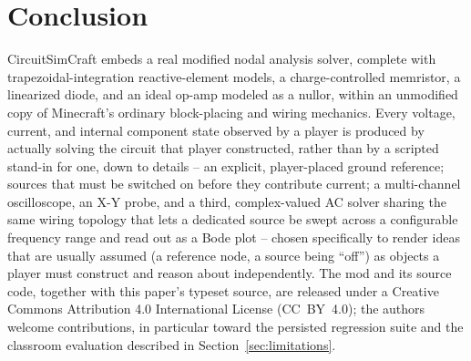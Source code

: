 \section{Conclusion}
\label{sec:conclusion}

CircuitSimCraft embeds a real modified nodal analysis solver, complete with
trapezoidal-integration reactive-element models, a charge-controlled memristor, a linearized
diode, and an ideal op-amp modeled as a nullor, within an unmodified copy of Minecraft's
ordinary block-placing and wiring mechanics. Every voltage, current, and internal component
state observed by a player is produced by actually solving the circuit that player
constructed, rather than by a scripted stand-in for one, down to details -- an explicit,
player-placed ground reference; sources that must be switched on before they contribute
current; a multi-channel oscilloscope, an X-Y probe, and a third, complex-valued AC solver
sharing the same wiring topology that lets a dedicated source be swept across a configurable
frequency range and read out as a Bode plot -- chosen specifically to render ideas that are
usually assumed (a reference node, a source being ``off'') as objects a player must construct
and reason about independently. The mod and its source code, together with this paper's
typeset source, are released under a Creative Commons Attribution 4.0 International License
(CC~BY~4.0); the authors welcome contributions,
in particular toward the persisted regression suite and the classroom evaluation described in
Section~\ref{sec:limitations}.
